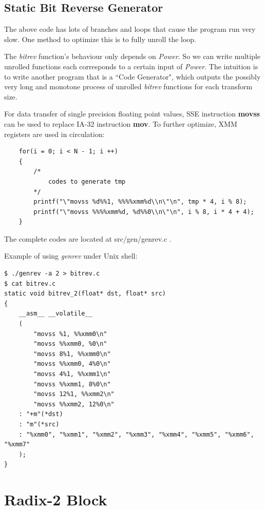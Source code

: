 \documentclass[a4paper]{report}
\begin{document}
\subsection{Static Bit Reverse Generator} \indent

	The above code has lots of branches and loops that cause the program run very slow. One method to optimize this is to fully unroll the loop.
	
	The \textit{bitrev} function's behaviour only depends on \textit{Power}. So we can write multiple unrolled functions each corresponds to a certain input of \textit{Power}. The intuition is to write another program that is a ``Code Generator", which outputs the possibly very long and monotone process of unrolled \textit{bitrev} functions for each transform size.
	
	For data transfer of single precision floating point values, SSE instruction \textbf{movss} can be used to replace IA-32 instruction \textbf{mov}. To further optimize, XMM registers are used in circulation:

        \lstset{language = c, tabsize = 4}
        \begin{lstlisting}
    for(i = 0; i < N - 1; i ++)
    {
    	/*
    		codes to generate tmp
    	*/
        printf("\"movss %d%%1, %%%%xmm%d\\n\"\n", tmp * 4, i % 8);
        printf("\"movss %%%%xmm%d, %d%%0\\n\"\n", i % 8, i * 4 + 4);
	}
        \end{lstlisting}

	The complete codes are located at src/gen/genrev.c .
	
	Example of using \textit{genrev} under Unix shell:

        \lstset{language = sh, tabsize = 4}
        \begin{lstlisting}
$ ./genrev -a 2 > bitrev.c
$ cat bitrev.c
static void bitrev_2(float* dst, float* src)
{
    __asm__ __volatile__
    (
        "movss %1, %%xmm0\n"
        "movss %%xmm0, %0\n"
        "movss 8%1, %%xmm0\n"
        "movss %%xmm0, 4%0\n"
        "movss 4%1, %%xmm1\n"
        "movss %%xmm1, 8%0\n"
        "movss 12%1, %%xmm2\n"
        "movss %%xmm2, 12%0\n"
    : "+m"(*dst)
    : "m"(*src)
    : "%xmm0", "%xmm1", "%xmm2", "%xmm3", "%xmm4", "%xmm5", "%xmm6", "%xmm7"
    );
}
        \end{lstlisting}

\section{Radix-2 Block} \indent
\end{document}

